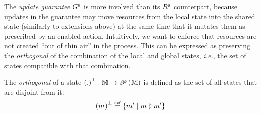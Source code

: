The \emph{update guarantee} $G^{\textsf{u}}$ is more involved than its
$R^{\textsf{u}}$ counterpart, because updates in the guarantee may move
resources from the local state into the shared state (similarly to
extensions above) at the same time that it mutates them as prescribed
by an enabled action. Intuitively, we want to enforce that resources
are not created ``out of thin air'' in the process. This can be
expressed as preserving the \emph{orthogonal} of the combination of
the local and global states, \textit{i.e.}, the set of states
compatible with that combination.

\begin{definition}[Orthogonal]\label{def:orthogonal}
The \emph{orthogonal} of a state  $\left(.\right)^{\bot}: \mathbb{M} \rightarrow
\mathscr{P}\left(\mathbb{M} \right)$ is defined as the set of all states that are disjoint
from it:
\[
\left(m_{}\right)^{\bot} \mathrel{\stackrel{\smash{\scriptscriptstyle{\mathrm{def}}}}{=}} \left\{ m_{}' \mid m_{} \mathrel{\sharp} m_{}' \right\}
\]
\end{definition}

